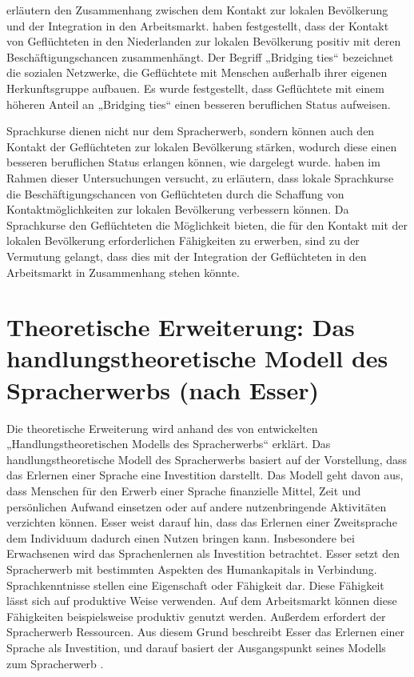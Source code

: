 \textcite{doi:10.1111/j.1747-7379.2010.00810.x} erläutern den Zusammenhang zwischen dem Kontakt zur lokalen Bevölkerung und der Integration in den Arbeitsmarkt. \textcite{doi:10.1111/j.1747-7379.2010.00810.x} haben festgestellt, dass der Kontakt von Geflüchteten in den Niederlanden zur lokalen Bevölkerung positiv mit deren Beschäftigungschancen zusammenhängt. Der Begriff „Bridging ties“ bezeichnet die sozialen Netzwerke, die Geflüchtete mit Menschen außerhalb ihrer eigenen Herkunftsgruppe aufbauen. Es wurde festgestellt, dass Geflüchtete mit einem höheren Anteil an „Bridging ties“ einen besseren beruflichen Status aufweisen.

Sprachkurse dienen nicht nur dem Spracherwerb, sondern können auch den Kontakt der Geflüchteten zur lokalen Bevölkerung stärken, wodurch diese einen besseren beruflichen Status erlangen können, wie dargelegt wurde. \textcite{Kanas:2023} haben im Rahmen dieser Untersuchungen versucht, zu erläutern, dass lokale Sprachkurse die Beschäftigungschancen von Geflüchteten durch die Schaffung von Kontaktmöglichkeiten zur lokalen Bevölkerung verbessern können. Da Sprachkurse den Geflüchteten die Möglichkeit bieten, die für den Kontakt mit der lokalen Bevölkerung erforderlichen Fähigkeiten zu erwerben, sind \textcite{Kanas:2023} zu der Vermutung gelangt, dass dies mit der Integration der Geflüchteten in den Arbeitsmarkt in Zusammenhang stehen könnte.


\section{Theoretische Erweiterung: Das handlungstheoretische Modell des Spracherwerbs (nach Esser)}
\label{cha:Erweiterung}

Die theoretische Erweiterung wird anhand des von \textcite{Esser:2006} entwickelten „Handlungstheoretischen Modells des Spracherwerbs“ erklärt. Das handlungstheoretische Modell des Spracherwerbs basiert auf der Vorstellung, dass das Erlernen einer Sprache eine Investition darstellt. Das Modell geht davon aus, dass Menschen für den Erwerb einer Sprache finanzielle Mittel, Zeit und persönlichen Aufwand einsetzen oder auf andere nutzenbringende Aktivitäten verzichten können. Esser weist darauf hin, dass das Erlernen einer Zweitsprache dem Individuum dadurch einen Nutzen bringen kann. Insbesondere bei Erwachsenen wird das Sprachenlernen als Investition betrachtet. Esser setzt den Spracherwerb mit bestimmten Aspekten des Humankapitals in Verbindung. Sprachkenntnisse stellen eine Eigenschaft oder Fähigkeit dar. Diese Fähigkeit lässt sich auf produktive Weise verwenden. Auf dem Arbeitsmarkt können diese Fähigkeiten beispielsweise produktiv genutzt werden. Außerdem erfordert der Spracherwerb Ressourcen. Aus diesem Grund beschreibt Esser das Erlernen einer Sprache als Investition, und darauf basiert der Ausgangspunkt seines Modells zum Spracherwerb \parencite[59--63]{Esser:2006}.

